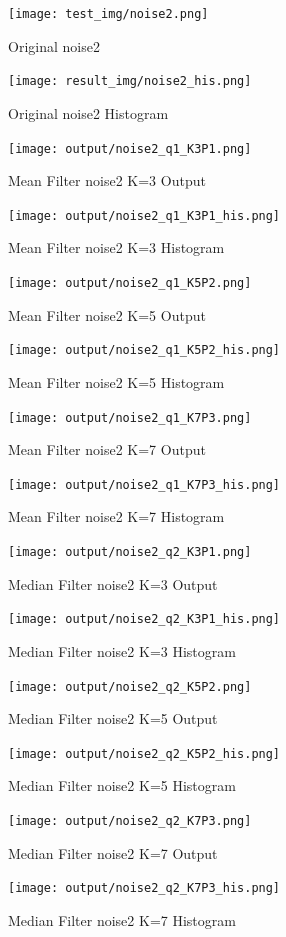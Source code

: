 \documentclass[12pt,a4paper]{report}
\begin{document}
\begin{figure}[!htb]
  \centering
  \texttt{[image: test\_img/noise2.png]}
  \caption{Original noise2}
  \texttt{[image: result\_img/noise2\_his.png]}
  \caption{Original noise2 Histogram}
\end{figure}
\begin{figure}[!htb]
  \texttt{[image: output/noise2\_q1\_K3P1.png]}
  \caption{Mean Filter noise2 K=3 Output}
  \texttt{[image: output/noise2\_q1\_K3P1\_his.png]}
  \caption{Mean Filter noise2 K=3 Histogram}
\end{figure}
\begin{figure}[!htb]
  \texttt{[image: output/noise2\_q1\_K5P2.png]}
  \caption{Mean Filter noise2 K=5 Output}
  \texttt{[image: output/noise2\_q1\_K5P2\_his.png]}
  \caption{Mean Filter noise2 K=5 Histogram}
\end{figure}
\begin{figure}[!htb]
  \texttt{[image: output/noise2\_q1\_K7P3.png]}
  \caption{Mean Filter noise2 K=7 Output}
  \texttt{[image: output/noise2\_q1\_K7P3\_his.png]}
  \caption{Mean Filter noise2 K=7 Histogram}
\end{figure}
\begin{figure}[!htb]
  \texttt{[image: output/noise2\_q2\_K3P1.png]}
  \caption{Median Filter noise2 K=3 Output}
  \texttt{[image: output/noise2\_q2\_K3P1\_his.png]}
  \caption{Median Filter noise2 K=3 Histogram}
\end{figure}
\begin{figure}[!htb]
  \texttt{[image: output/noise2\_q2\_K5P2.png]}
  \caption{Median Filter noise2 K=5 Output}
  \texttt{[image: output/noise2\_q2\_K5P2\_his.png]}
  \caption{Median Filter noise2 K=5 Histogram}
\end{figure}
\begin{figure}[!htb]
  \texttt{[image: output/noise2\_q2\_K7P3.png]}
  \caption{Median Filter noise2 K=7 Output}
  \texttt{[image: output/noise2\_q2\_K7P3\_his.png]}
  \caption{Median Filter noise2 K=7 Histogram}
\end{figure}
\end{document}
